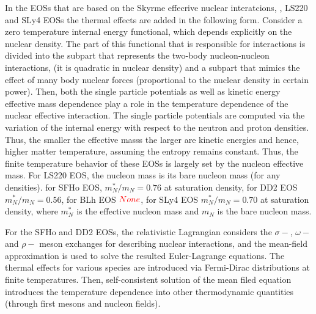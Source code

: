In the \acp{EOS} that are based on the Skyrme effecrive nuclear interatcions, \eg, LS220 and SLy4 \acp{EOS} 
the thermal effects are added in the following form. 
Consider a zero temperature internal energy functional, which depends explicitly on the nuclear density.
The part of this functional that is responsible for interactions is divided into the 
subpart that represents the two-body nucleon-nucleon interactions, (it is quadratic in nuclear density) and a 
subpart that mimics the effect of many body nuclear forces (proportional to the nuclear density in certain power).
Then, both the single particle potentials as well as kinetic energy effective mass dependence play a role
in the temperature dependence of the nuclear effective interaction.
%
The single particle potentials are computed via the variation of the internal energy with respect to the 
neutron and proton densities. Thus, the smaller the effective masss the larger are kinetic energies and hence, 
higher matter temperature, assuming the entropy remains constant.
Thus, the finite temperature behavior of these \acp{EOS} is largely set by the nucleon effective mass.
For LS220 \ac{EOS}, the nucleon mass is its bare nucleon mass (for any densities).
for SFHo \ac{EOS}, $m_N ^* / m_N = 0.76$ at saturation density, 
for DD2 \ac{EOS} $m_N^*/m_N = 0.56$, 
for BLh \ac{EOS} $\textcolor{red}{None}$,  
for SLy4 \ac{EOS} $m_N^*/m_N=0.70$ at saturation density, 
where $m_{N}^*$ is the effective nucleon mass and $m_N$ is the bare nucleon mass.

For the SFHo and DD2 \acp{EOS}, the relativistic Lagrangian considers the $\sigma-$, $\omega-$ and $\rho-$
meson exchanges for describing nuclear interactions, and the mean-field approximation is used
to solve the resulted Euler-Lagrange equations. 
%
The thermal effects for various species are introduced via Fermi-Dirac distributions at finite temperatures.
Then, self-consistent solution of the mean filed equation introduces the temperature dependence into other 
thermodynamic quantities (through first mesons and nucleon fields).

